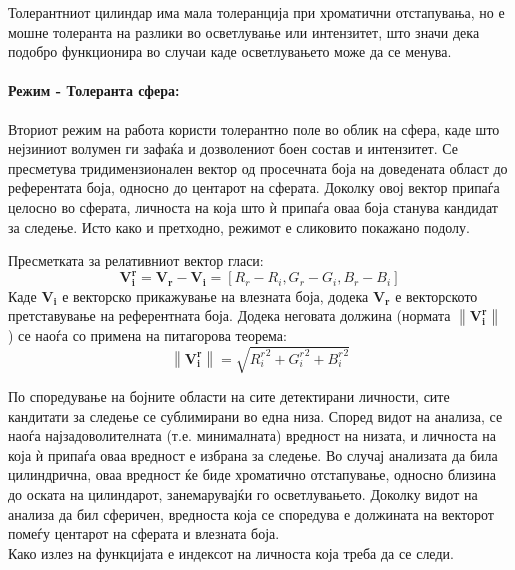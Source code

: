 \documentclass[11pt]{article}
\newcommand\norm[1]{\left\lVert#1\right\rVert}
\renewcommand{\vec}[1]{\mathbf{#1}}
\begin{document}
        Толерантниот цилиндар има мала толеранција при хроматични отстапувања, но е мошне толеранта на разлики во осветлување или интензитет, што значи дека подобро функционира во случаи каде осветлувањето може да се менува.

      \paragraph{Режим - Толеранта сфера:\\}
        Вториот режим на работа користи толерантно поле во облик на сфера, каде што нејзиниот волумен ги зафаќа и дозволениот боен состав и интензитет. Се пресметува тридимензионален вектор од просечната боја на доведената област до референтата боја, односно до центарот на сферата. Доколку овој вектор припаѓа целосно во сферата, личноста на која што ѝ припаѓа оваа боја станува кандидат за следење. Исто како и претходно, режимот е сликовито покажано подолу.

        Пресметката за релативниот вектор гласи:
        $$ \vec{V_i^r} = \vec{V_r} - \vec{V_i}= [R_r - R_i, G_r - G_i, B_r - B_i] $$
        Каде $\vec{V_i}$ е векторско прикажување на влезната боја, додека $\vec{V_r}$ е векторското претставување на референтната боја.
        Додека неговата должина (нормата $\norm{\vec{V_i^r}}$ ) се наоѓа со примена на питагорова теорема:
        $$ \norm{\vec{V_i^r}} = \sqrt{{R_i^r}^2 + {G_i^r}^2 + {B_i^r}^2} $$

        По споредување на бојните области на сите детектирани личности, сите кандитати за следење се сублимирани во една низа. Според видот на анализа, се наоѓа најзадоволителната (т.е. минималната) вредност на низата, и личноста на која ѝ припаѓа оваа вредност е избрана за следење. Во случај анализата да била цилиндрична, оваа вредност ќе биде хроматично отстапување, односно близина до оската на цилиндарот, занемарувајќи го осветлувањето. Доколку видот на анализа да бил сферичен, вредноста која се споредува е должината на векторот помеѓу центарот на сферата и влезната боја.
        \\
        Како излез на функцијата е индексот на личноста која треба да се следи.
\end{document}
